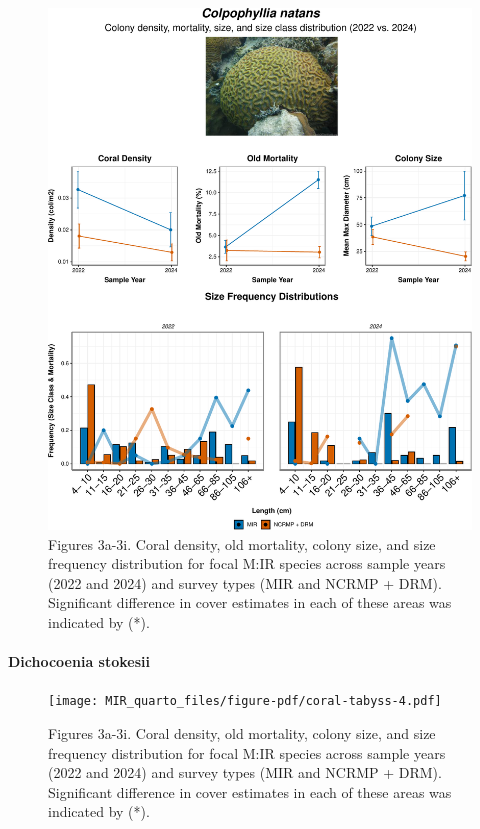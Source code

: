 \documentclass[
]{article}
\let\oldparagraph\paragraph
\renewcommand{\paragraph}[1]{\oldparagraph{#1}\mbox{}}
\begin{document}
\begin{figure}

{\centering \includegraphics{MIR_quarto_files/figure-pdf/coral-tabyss-3.pdf}

}

\caption{Figures 3a-3i. Coral density, old mortality, colony size, and
size frequency distribution for focal M:IR species across sample years
(2022 and 2024) and survey types (MIR and NCRMP + DRM). Significant
difference in cover estimates in each of these areas was indicated by
(*).}

\end{figure}

\hypertarget{dichocoenia-stokesii}{%
\paragraph{\texorpdfstring{ Dichocoenia stokesii
}{ Dichocoenia stokesii }}\label{dichocoenia-stokesii}}

\begin{figure}

{\centering \texttt{[image: MIR\_quarto\_files/figure-pdf/coral-tabyss-4.pdf]}

}

\caption{Figures 3a-3i. Coral density, old mortality, colony size, and
size frequency distribution for focal M:IR species across sample years
(2022 and 2024) and survey types (MIR and NCRMP + DRM). Significant
difference in cover estimates in each of these areas was indicated by
(*).}

\end{figure}
\end{document}
